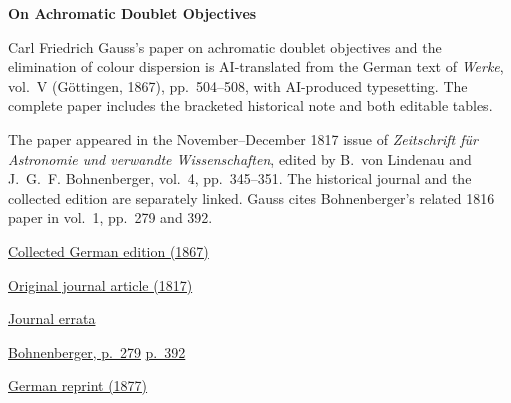 \clearpage
\thispagestyle{empty}
\begin{center}\Large\textbf{On Achromatic Doublet Objectives}\end{center}

Carl Friedrich Gauss’s paper on achromatic doublet objectives and the elimination of colour dispersion is AI-translated from the German text of \textit{Werke}, vol.~V (Göttingen, 1867), pp.~504--508, with AI-produced typesetting. The complete paper includes the bracketed historical note and both editable tables.

The paper appeared in the November--December 1817 issue of \textit{Zeitschrift für Astronomie und verwandte Wissenschaften}, edited by B.~von Lindenau and J.~G.~F. Bohnenberger, vol.~4, pp.~345--351. The historical journal and the collected edition are separately linked. Gauss cites Bohnenberger’s related 1816 paper in vol.~1, pp.~279 and 392.

\medskip\noindent
\href{https://gdz.sub.uni-goettingen.de/id/PPN236006339}{Collected German edition (1867)}\par
\noindent\href{https://www.digitale-sammlungen.de/view/bsb10061006?page=345}{Original journal article (1817)}\par
\noindent\href{https://www.digitale-sammlungen.de/view/bsb10061006?page=390}{Journal errata}\par
\noindent\href{https://www.digitale-sammlungen.de/view/bsb10061003?page=287}{Bohnenberger, p.~279}\quad
\href{https://www.digitale-sammlungen.de/view/bsb10061003?page=400}{p.~392}\par
\noindent\href{https://doi.org/10.1007/978-3-642-49319-5_24}{German reprint (1877)}
\clearpage
